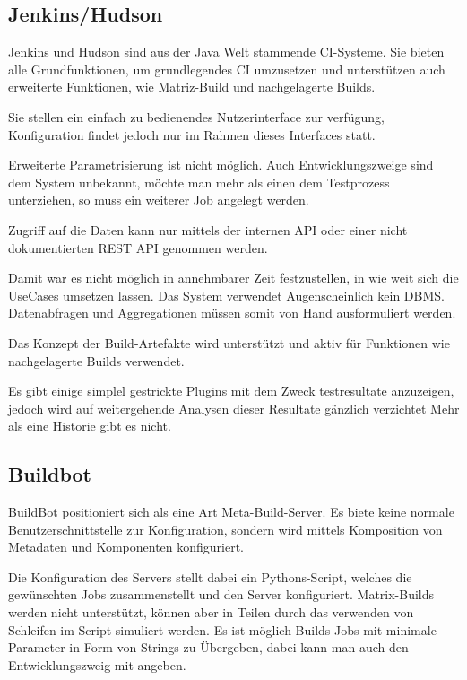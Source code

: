 \subsection{Jenkins/Hudson}

Jenkins und Hudson sind aus der Java Welt  stammende CI-Systeme.
Sie bieten alle Grundfunktionen, um grundlegendes CI umzusetzen
und unterst\"utzen auch erweiterte Funktionen,
wie Matriz-Build und nachgelagerte Builds.

Sie stellen ein einfach zu bedienendes Nutzerinterface zur verf\"ugung,
Konfiguration findet jedoch nur im Rahmen dieses Interfaces statt.

Erweiterte Parametrisierung ist nicht m\"oglich.
Auch Entwicklungszweige sind dem System unbekannt,
m\"ochte man mehr als einen dem Testprozess unterziehen,
so muss ein weiterer Job angelegt werden.

Zugriff auf die Daten kann nur mittels der internen API oder
einer nicht dokumentierten REST API genommen werden.

Damit war es nicht m\"oglich in annehmbarer Zeit festzustellen,
in wie weit sich die UseCases umsetzen lassen.
Das System verwendet Augenscheinlich kein DBMS.
Datenabfragen und Aggregationen m\"ussen
somit von Hand ausformuliert werden.

Das Konzept der Build-Artefakte wird unterst\"utzt und
aktiv f\"ur Funktionen wie nachgelagerte Builds verwendet.

Es gibt einige simplel gestrickte Plugins mit dem Zweck testresultate anzuzeigen,
jedoch wird auf weitergehende Analysen dieser Resultate g\"anzlich verzichtet
Mehr als eine Historie gibt es nicht.


\subsection{Buildbot}


BuildBot positioniert sich als eine Art Meta-Build-Server.
Es biete keine normale Benutzerschnittstelle zur Konfiguration,
sondern wird mittels Komposition von Metadaten und Komponenten konfiguriert.

Die Konfiguration des Servers stellt dabei ein Pythons-Script,
welches die gewünschten Jobs zusammenstellt und den Server konfiguriert.
Matrix-Builds werden nicht unterst\"utzt,
k\"onnen aber in Teilen durch das verwenden von Schleifen im Script simuliert werden.
Es ist möglich Builds Jobs mit minimale Parameter in Form von Strings zu Übergeben,
dabei kann man auch den Entwicklungszweig mit angeben.

